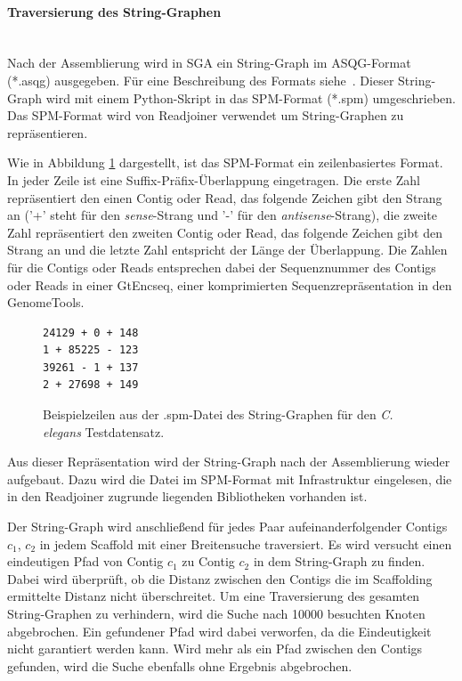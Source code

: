 \documentclass[a4paper,11pt,parskip,abstract=on]{scrartcl}
\begin{document}
\paragraph{Traversierung des String-Graphen}~\\
Nach der Assemblierung wird in SGA ein String-Graph im ASQG-Format
(*.asqg) ausgegeben. Für eine Beschreibung des Formats
siehe~\cite{asqg}. Dieser String-Graph wird mit einem Python-Skript in
das SPM-Format (*.spm) umgeschrieben. Das SPM-Format wird von
Readjoiner verwendet um String-Graphen zu repräsentieren.

Wie in Abbildung \ref{abb: spm} dargestellt, ist das SPM-Format ein
zeilenbasiertes Format. In jeder Zeile ist eine Suffix-Präfix-Überlappung
eingetragen. Die erste Zahl repräsentiert den einen Contig oder Read,
das folgende Zeichen gibt den Strang an ('+' steht für den
\textit{sense}-Strang und '-' für den \textit{antisense}-Strang), die
zweite Zahl repräsentiert den zweiten Contig oder Read, das folgende
Zeichen gibt den Strang an und die letzte Zahl entspricht der Länge
der Überlappung. Die Zahlen für die Contigs oder Reads entsprechen
dabei der Sequenznummer des Contigs oder Reads in einer GtEncseq,
einer komprimierten Sequenzrepräsentation in den GenomeTools.

\begin{figure}
  \centering
\begin{verbatim}
24129 + 0 + 148
1 + 85225 - 123
39261 - 1 + 137
2 + 27698 + 149
\end{verbatim}
\caption{\label{abb: spm}Beispielzeilen aus der .spm-Datei des
  String-Graphen für den \textit{C. elegans} Testdatensatz.}
\end{figure}

Aus dieser Repräsentation wird der String-Graph nach der Assemblierung
wieder aufgebaut. Dazu wird die Datei im SPM-Format mit Infrastruktur
eingelesen, die in den Readjoiner zugrunde liegenden Bibliotheken
vorhanden ist.

Der String-Graph wird anschließend für jedes Paar
aufeinanderfolgender Contigs $c_1$, $c_2$ in jedem Scaffold mit einer
Breitensuche traversiert. Es wird versucht einen eindeutigen Pfad von
Contig $c_1$ zu Contig $c_2$ in dem String-Graph zu finden. Dabei wird
überprüft, ob die Distanz zwischen den Contigs die im Scaffolding
ermittelte Distanz nicht überschreitet. Um eine Traversierung des
gesamten String-Graphen zu verhindern, wird die Suche nach \num{10000}
besuchten Knoten abgebrochen. Ein gefundener Pfad wird dabei
verworfen, da die Eindeutigkeit nicht garantiert werden kann. Wird
mehr als ein Pfad zwischen den Contigs gefunden, wird die Suche
ebenfalls ohne Ergebnis abgebrochen.
\end{document}

